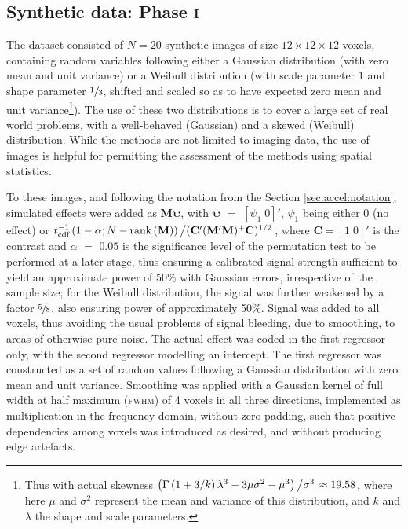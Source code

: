 \subsection{Synthetic data: Phase \textsc{i}}

The dataset consisted of $N=20$ synthetic images of size $12 \times 12 \times 12$ voxels, containing random variables following either a Gaussian distribution (with zero mean and unit variance) or a Weibull distribution (with scale parameter $1$ and shape parameter $\sfrac{1}{3}$, shifted and scaled so as to have expected zero mean and unit variance\footnote{Thus with actual skewness $\left(\Gamma\left(1+3/k\right)\lambda^3-3\mu\sigma^2-\mu^3\right)\left/\sigma^3\right. \approx 19.58$, where here $\mu$ and $\sigma^2$ represent the mean and variance of this distribution, and $k$ and $\lambda$ the shape and scale parameters.}). The use of these two distributions is to cover a large set of real world problems, with a well-behaved (Gaussian) and a skewed (Weibull) distribution. While the methods are not limited to imaging data, the use of images is helpful for permitting the assessment of the methods using spatial statistics.

To these images, and following the notation from the Section \ref{sec:accel:notation}, simulated effects were added as $\mathbf{M}\boldsymbol{\psi}$, with $\boldsymbol{\psi}$ $=$ $[\psi_1 \; 0]'$, $\psi_1$ being either 0 (no effect) or $t^{-1}_{\text{cdf}}\left(1-\alpha ; N-\text{rank}\left(\mathbf{M}\right)\right)\left/(\mathbf{C}'(\mathbf{M}'\mathbf{M})^+\mathbf{C})^{1/2}\right.$, where $\mathbf{C} = [1 \; 0]'$ is the contrast and $\alpha$ $=$ $0.05$ is the significance level of the permutation test to be performed at a later stage, thus ensuring a calibrated signal strength sufficient to yield an approximate power of 50\% with Gaussian errors, irrespective of the sample size; for the Weibull distribution, the signal was further weakened by a factor $\sfrac{5}{8}$, also ensuring power of approximately 50\%. Signal was added to all voxels, thus avoiding the usual problems of signal bleeding, due to smoothing, to areas of otherwise pure noise. The actual effect was coded in the first regressor only, with the second regressor modelling an intercept. The first regressor was constructed as a set of random values following a Gaussian distribution with zero mean and unit variance. Smoothing was applied with a Gaussian kernel of full width at half maximum (\textsc{fwhm}) of 4 voxels in all three directions, implemented as multiplication in the frequency domain, without zero padding, such that positive dependencies among voxels was introduced as desired, and without producing edge artefacts.

